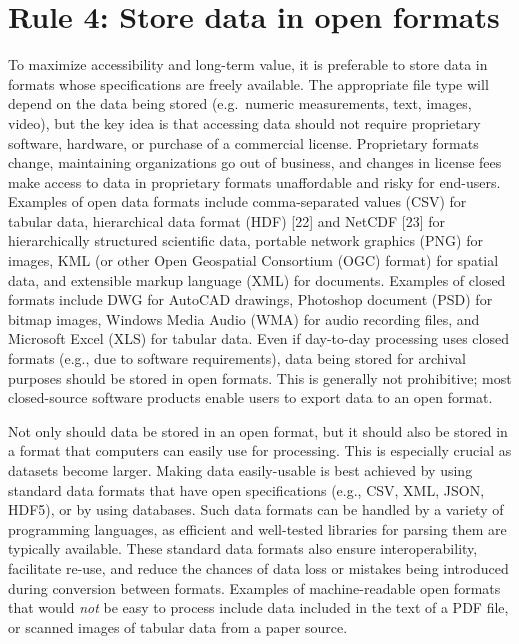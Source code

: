 \documentclass[10pt,letterpaper]{article}
\begin{document}
\section*{Rule 4: Store data in open
formats}\label{rule-4-store-data-in-open-formats}

To maximize accessibility and long-term value, it is preferable to store
data in formats whose specifications are freely available. The
appropriate file type will depend on the data being stored (e.g.~numeric
measurements, text, images, video), but the key idea is that accessing
data should not require proprietary software, hardware, or purchase of a
commercial license. Proprietary formats change, maintaining
organizations go out of business, and changes in license fees make
access to data in proprietary formats unaffordable and risky for
end-users. Examples of open data formats include comma-separated values
(CSV) for tabular data, hierarchical data format (HDF) {[}22{]} and
NetCDF {[}23{]} for hierarchically structured scientific data, portable
network graphics (PNG) for images, KML (or other Open Geospatial
Consortium (OGC) format) for spatial data, and extensible markup
language (XML) for documents. Examples of closed formats include DWG for
AutoCAD drawings, Photoshop document (PSD) for bitmap images, Windows
Media Audio (WMA) for audio recording files, and Microsoft Excel (XLS)
for tabular data. Even if day-to-day processing uses closed formats
(e.g., due to software requirements), data being stored for archival
purposes should be stored in open formats. This is generally not
prohibitive; most closed-source software products enable users to export
data to an open format.

Not only should data be stored in an open format, but it should also be
stored in a format that computers can easily use for processing. This is
especially crucial as datasets become larger. Making data easily-usable
is best achieved by using standard data formats that have open
specifications (e.g., CSV, XML, JSON, HDF5), or by using databases. Such
data formats can be handled by a variety of programming languages, as
efficient and well-tested libraries for parsing them are typically
available. These standard data formats also ensure interoperability,
facilitate re-use, and reduce the chances of data loss or mistakes being
introduced during conversion between formats. Examples of
machine-readable open formats that would \emph{not} be easy to process
include data included in the text of a PDF file, or scanned images of
tabular data from a paper source.
\end{document}
